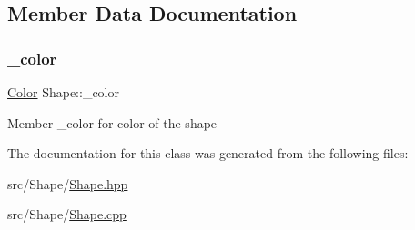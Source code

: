 \subsection{Member Data Documentation}
\hypertarget{class_shape_a5b499b01e45f0dbd8bbc64172f169213}{}\label{class_shape_a5b499b01e45f0dbd8bbc64172f169213} 
\subsubsection{\texorpdfstring{\+\_\+color}{\_color}}
{\footnotesize\ttfamily \hyperlink{class_color}{Color} Shape\+::\+\_\+color\hspace{0.3cm}{\ttfamily [protected]}}

Member \+\_\+color for color of the shape 

The documentation for this class was generated from the following files\+:\begin{DoxyCompactItemize}
\item 
src/\+Shape/\hyperlink{_shape_8hpp}{Shape.\+hpp}\item 
src/\+Shape/\hyperlink{_shape_8cpp}{Shape.\+cpp}\end{DoxyCompactItemize}
